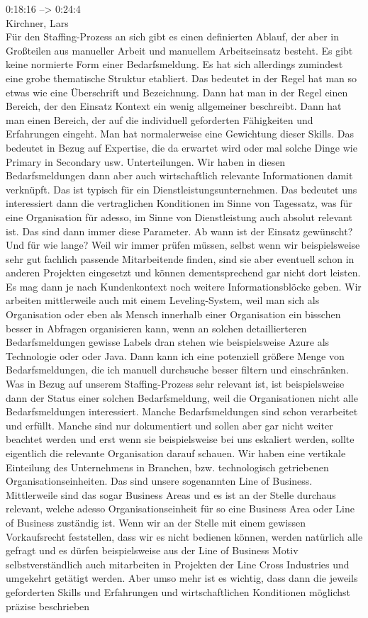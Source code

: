 0:18:16 --> 0:24:4\\
Kirchner, Lars\\
Für den Staffing-Prozess an sich gibt es einen definierten Ablauf, der aber in Großteilen aus manueller Arbeit und manuellem Arbeitseinsatz besteht. Es gibt keine normierte Form einer Bedarfsmeldung. Es hat sich allerdings zumindest eine grobe thematische Struktur etabliert. Das bedeutet in der Regel hat man so etwas wie eine Überschrift und Bezeichnung. Dann hat man in der Regel einen Bereich, der den Einsatz Kontext ein wenig allgemeiner beschreibt. Dann hat man einen Bereich, der auf die individuell geforderten Fähigkeiten und Erfahrungen eingeht. Man hat normalerweise eine Gewichtung dieser Skills. Das bedeutet in Bezug auf Expertise, die da erwartet wird oder mal solche Dinge wie Primary in Secondary usw. Unterteilungen. Wir haben in diesen Bedarfsmeldungen dann aber auch wirtschaftlich relevante Informationen damit verknüpft. Das ist typisch für ein Dienstleistungsunternehmen. Das bedeutet uns interessiert dann die vertraglichen Konditionen im Sinne von Tagessatz, was für eine Organisation für adesso, im Sinne von Dienstleistung auch absolut relevant ist. Das sind dann immer diese Parameter. Ab wann ist der Einsatz gewünscht? Und für wie lange? Weil wir immer prüfen müssen, selbst wenn wir beispielsweise sehr gut fachlich passende Mitarbeitende finden, sind sie aber eventuell schon in anderen Projekten eingesetzt und können dementsprechend gar nicht dort leisten. Es mag dann je nach Kundenkontext noch weitere Informationsblöcke geben. Wir arbeiten mittlerweile auch mit einem Leveling-System, weil man sich als Organisation oder eben als Mensch innerhalb einer Organisation ein bisschen besser in Abfragen organisieren kann, wenn an solchen detaillierteren Bedarfsmeldungen gewisse Labels dran stehen wie beispielsweise Azure als Technologie oder oder Java. Dann kann ich eine potenziell größere Menge von Bedarfsmeldungen, die ich manuell durchsuche besser filtern und einschränken. Was in Bezug auf unserem Staffing-Prozess sehr relevant ist, ist beispielsweise dann der Status einer solchen Bedarfsmeldung, weil die Organisationen nicht alle Bedarfsmeldungen interessiert. Manche Bedarfsmeldungen sind schon verarbeitet und erfüllt. Manche sind nur dokumentiert und sollen aber gar nicht weiter beachtet werden und erst wenn sie beispielsweise bei uns eskaliert werden, sollte eigentlich die relevante Organisation darauf schauen. Wir haben eine vertikale Einteilung des Unternehmens in Branchen, bzw. technologisch getriebenen Organisationseinheiten. Das sind unsere sogenannten Line of Business. Mittlerweile sind das sogar Business Areas und es ist an der Stelle durchaus relevant, welche adesso Organisationseinheit für so eine Business Area oder Line of Business zuständig ist. Wenn wir an der Stelle mit einem gewissen Vorkaufsrecht feststellen, dass wir es nicht bedienen können, werden natürlich alle gefragt und es dürfen beispielsweise aus der Line of Business Motiv selbstverständlich auch mitarbeiten in Projekten der Line Cross Industries und umgekehrt getätigt werden. Aber umso mehr ist es wichtig, dass dann die jeweils geforderten Skills und Erfahrungen und wirtschaftlichen Konditionen möglichst präzise beschrieben 